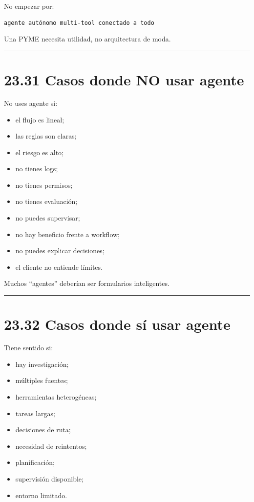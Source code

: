 No empezar por:

\begin{lstlisting}
agente autónomo multi-tool conectado a todo
\end{lstlisting}

Una PYME necesita utilidad, no arquitectura de moda.

\begin{center}\rule{0.5\linewidth}{0.5pt}\end{center}

\section{23.31 Casos donde NO usar
agente}\label{casos-donde-no-usar-agente}

No uses agente si:

\begin{itemize}
\tightlist
\item
  el flujo es lineal;
\item
  las reglas son claras;
\item
  el riesgo es alto;
\item
  no tienes logs;
\item
  no tienes permisos;
\item
  no tienes evaluación;
\item
  no puedes supervisar;
\item
  no hay beneficio frente a workflow;
\item
  no puedes explicar decisiones;
\item
  el cliente no entiende límites.
\end{itemize}

Muchos ``agentes'' deberían ser formularios inteligentes.

\begin{center}\rule{0.5\linewidth}{0.5pt}\end{center}

\section{23.32 Casos donde sí usar
agente}\label{casos-donde-suxed-usar-agente}

Tiene sentido si:

\begin{itemize}
\tightlist
\item
  hay investigación;
\item
  múltiples fuentes;
\item
  herramientas heterogéneas;
\item
  tareas largas;
\item
  decisiones de ruta;
\item
  necesidad de reintentos;
\item
  planificación;
\item
  supervisión disponible;
\item
  entorno limitado.
\end{itemize}

